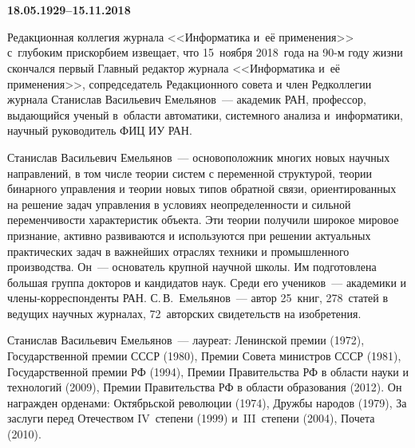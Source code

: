    \vspace*{-48pt}

\begin{center}
\vspace*{6pt}
\mbox{%
\epsfxsize=79mm
}
\end{center}

\vspace*{6pt} %


   \begin{center}
\\[12pt]
\textbf{\large 18.05.1929--15.11.2018}
   \end{center}



   \vspace*{5mm}

   \thispagestyle{empty}




Редакционная коллегия журнала <<Информатика и~её применения>> 
с~глубоким прискорбием извещает, что 15~ноября 2018~года на 90-м году жизни 
скончался первый Главный редактор журнала <<Информатика и~её применения>>, 
сопредседатель Редакционного совета и член Редколлегии журнала Станислав Ва\-силь\-евич 
Емельянов~---  академик РАН, профессор, выдающийся ученый 
в~области автоматики, системного анализа и~информатики, научный руководитель 
ФИЦ ИУ РАН. 

Станислав Ва\-силь\-евич Емельянов~--- 
основоположник многих новых научных направлений, в том числе теории 
систем с переменной структурой, теории бинарного управления и теории 
новых типов обратной связи, ориентированных на решение задач управления в условиях 
неопределенности и сильной переменчивости характеристик объекта. 
Эти теории получили широкое мировое признание, активно развиваются и используются 
при решении актуальных практических задач в важнейших отраслях техники и промышленного 
производства. Он~--- основатель крупной научной школы. Им подготовлена большая группа 
докторов и кандидатов наук. Среди его учеников~--- 
академики и чле\-ны-кор\-рес\-пон\-ден\-ты РАН. С.\,В.~Емельянов~--- 
автор 25~книг, 278~статей в ведущих научных журналах, 72~авторских свидетельств 
на изобретения. 

Станислав Васильевич Емельянов~--- лауреат: Ленинской премии (1972), 
Государственной премии СССР (1980), Премии Совета министров СССР (1981), 
Государственной премии РФ (1994), Премии Правительства РФ в области 
науки и технологий (2009), Премии Правительства РФ в области образования (2012). 
Он награжден орденами: Октябрьской революции (1974), Дружбы народов (1979), 
За заслуги перед Отечеством IV~степени (1999) и~III~степени (2004), Почета (2010). 

